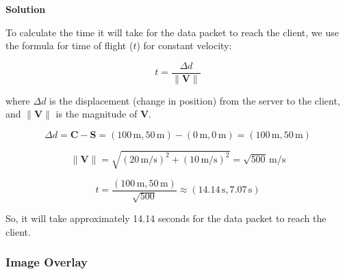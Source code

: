 \documentclass{beamer}
\begin{document}
\begin{frame}[plain]
\vspace{5pt}
\textbf{Solution}

To calculate the time it will take for the data packet to reach the client, we use the formula for time of flight (\( t \)) for constant velocity:

\[ t = \frac{\Delta d}{\| \mathbf{V} \|} \]

where \( \Delta d \) is the displacement (change in position) from the server to the client, and \( \| \mathbf{V} \| \) is the magnitude of \( \mathbf{V} \).

\[ \Delta d = \mathbf{C} - \mathbf{S} = (100 \, \text{m}, 50 \, \text{m}) - (0 \, \text{m}, 0 \, \text{m}) = (100 \, \text{m}, 50 \, \text{m}) \]

\[ \| \mathbf{V} \| = \sqrt{(20 \, \text{m/s})^2 + (10 \, \text{m/s})^2} = \sqrt{500} \, \text{m/s} \]

\[ t = \frac{(100 \, \text{m}, 50 \, \text{m})}{\sqrt{500}} \approx (14.14 \, \text{s}, 7.07 \, \text{s}) \]

So, it will take approximately 14.14 seconds for the data packet to reach the client.
\end{frame}



\begin{frame}[plain]
        \frametitle{Image Overlay}
    
\end{frame}
\end{document}
